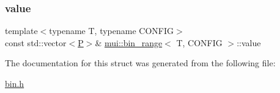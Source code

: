 \subsubsection{\texorpdfstring{value}{value}}
{\footnotesize\ttfamily template$<$typename T, typename C\+O\+N\+F\+IG$>$ \\
const std\+::vector$<$\hyperlink{structmui_1_1bin__range_af4a922fdb02454e89adce8ea9bb21f35}{P}$>$\& \hyperlink{structmui_1_1bin__range}{mui\+::bin\+\_\+range}$<$ T, C\+O\+N\+F\+IG $>$\+::value}



The documentation for this struct was generated from the following file\+:\begin{DoxyCompactItemize}
\item 
\hyperlink{bin_8h}{bin.\+h}\end{DoxyCompactItemize}
